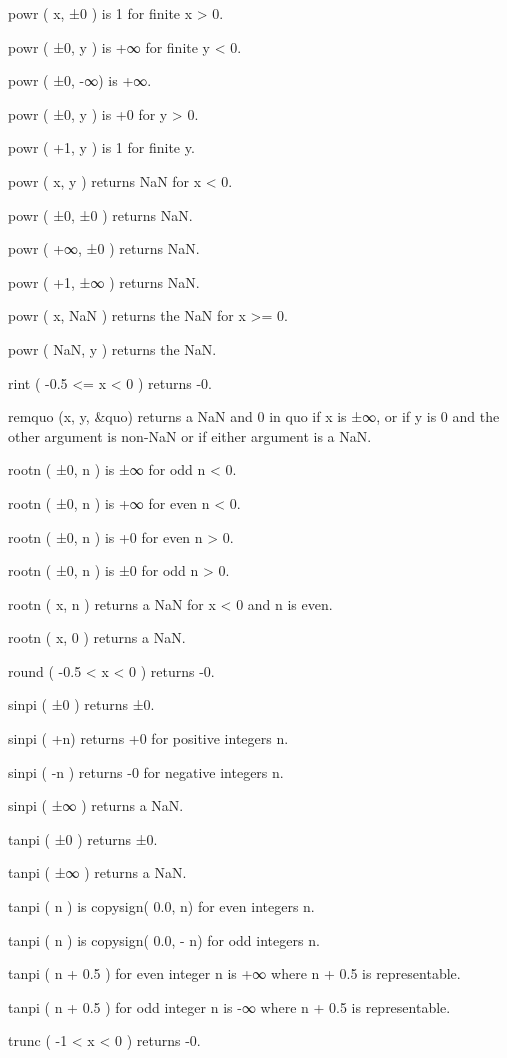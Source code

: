 powr ( x, ±0 ) is 1 for finite x > 0.\par
powr ( ±0, y ) is +∞ for finite y < 0.\par
powr ( ±0, -∞) is +∞.\par
powr ( ±0, y ) is +0 for y > 0.\par
powr ( +1, y ) is 1 for finite y.\par
powr ( x, y ) returns NaN for x < 0.\par
powr ( ±0, ±0 ) returns NaN.\par
powr ( +∞, ±0 ) returns NaN.\par
powr ( +1, ±∞ ) returns NaN.\par
powr ( x, NaN ) returns the NaN for x >= 0.\par
powr ( NaN, y ) returns the NaN.\par

rint ( -0.5 <= x < 0 ) returns -0.\par

remquo (x, y, &quo) returns a NaN and 0 in quo if x is ±∞,
or if y is 0 and the other argument is non-NaN or if either argument is a NaN.\par

rootn ( ±0, n ) is ±∞ for odd n < 0.\par
rootn ( ±0, n ) is +∞ for even n < 0.\par
rootn ( ±0, n ) is +0 for even n > 0.\par
rootn ( ±0, n ) is ±0 for odd n > 0.\par
rootn ( x, n ) returns a NaN for x < 0 and n is even.\par
rootn ( x, 0 ) returns a NaN.\par

round ( -0.5 < x < 0 ) returns -0.\par

sinpi ( ±0 ) returns ±0.\par
sinpi ( +n) returns +0 for positive integers n.\par
sinpi ( -n ) returns -0 for negative integers n.\par
sinpi ( ±∞ ) returns a NaN.\par

tanpi ( ±0 ) returns ±0.\par
tanpi ( ±∞ ) returns a NaN.\par
tanpi ( n ) is copysign( 0.0, n) for even integers n.\par
tanpi ( n ) is copysign( 0.0, - n) for odd integers n.\par
tanpi ( n + 0.5 ) for even integer n is +∞ where n + 0.5 is representable.\par
tanpi ( n + 0.5 ) for odd integer n is -∞ where n + 0.5 is representable.\par

trunc ( -1 < x < 0 ) returns -0.\par

